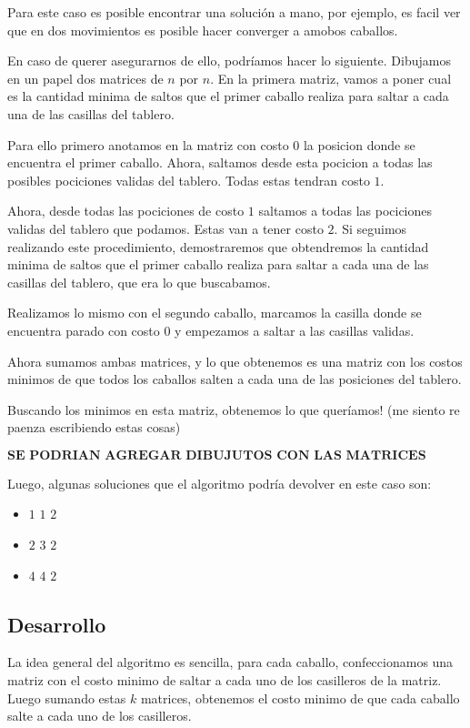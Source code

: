 Para este caso es posible encontrar una soluci\'on a mano, por ejemplo, es facil ver que en dos movimientos es posible hacer converger a amobos caballos.

En caso de querer asegurarnos de ello, podr\'iamos hacer lo siguiente. Dibujamos en un papel dos matrices de $n$ por $n$. En la primera matriz, vamos a poner cual es la cantidad minima de saltos que el primer caballo realiza para saltar a cada una de las casillas del tablero. 

Para ello primero anotamos en la matriz con costo $0$ la posicion donde se encuentra el primer caballo. Ahora, saltamos desde esta pocicion a todas las posibles pociciones validas del tablero. Todas estas tendran costo $1$.

Ahora, desde todas las pociciones de costo $1$ saltamos a todas las pociciones validas del tablero que podamos. Estas van a tener costo $2$. Si seguimos realizando este procedimiento, demostraremos que obtendremos la cantidad minima de saltos que el primer caballo realiza para saltar a cada una de las casillas del tablero, que era lo que buscabamos.

Realizamos lo mismo con el segundo caballo, marcamos la casilla donde se encuentra parado con costo $0$ y empezamos a saltar a las casillas validas.

Ahora sumamos ambas matrices, y lo que obtenemos es una matriz con los costos minimos de que todos los caballos salten a cada una de las posiciones del tablero.

Buscando los minimos en esta matriz, obtenemos lo que quer\'iamos! (me siento re paenza escribiendo estas cosas)




$$\textbf{SE PODRIAN AGREGAR DIBUJUTOS CON LAS MATRICES PARA QUE QUEDE CLARO}$$


Luego, algunas soluciones que el algoritmo podr\'ia devolver en este caso son:

\begin{itemize}
\item $1$ $1$ $2$ 
\item $2$ $3$ $2$
\item $4$ $4$ $2$ 
\end{itemize}

\subsection{Desarrollo}
La idea general del algoritmo es sencilla, para cada caballo, confeccionamos una matriz con el costo minimo de saltar a cada uno de los casilleros de la matriz. Luego sumando estas $k$ matrices, obtenemos el costo minimo de que cada caballo salte a cada uno de los casilleros.

